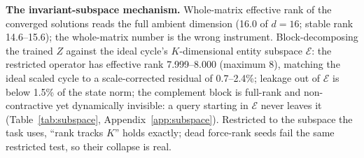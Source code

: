 \textbf{The invariant-subspace mechanism.} Whole-matrix effective rank
of the converged solutions reads the full ambient dimension (16.0 of
$d{=}16$; stable rank 14.6--15.6); the whole-matrix number is the wrong
instrument.
Block-decomposing the trained $Z$ against the ideal cycle's
$K$-dimensional entity subspace $\mathcal{E}$: the restricted operator
has effective rank 7.999--8.000 (maximum 8), matching the ideal scaled
cycle to a scale-corrected residual of 0.7--2.4\%; leakage out of
$\mathcal{E}$ is below 1.5\% of the state norm; the complement block is
full-rank and non-contractive yet dynamically invisible: a query
starting in $\mathcal{E}$ never leaves it (Table~\ref{tab:subspace},
Appendix~\ref{app:subspace}).
Restricted to the subspace the task uses, ``rank tracks $K$'' holds
exactly; dead force-rank seeds fail the same restricted test, so their
collapse is real.
